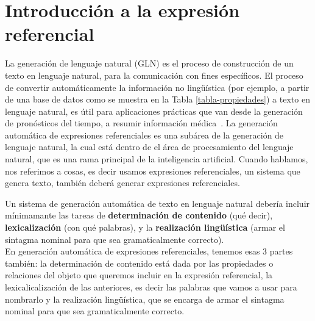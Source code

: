 \chapter{Introducci\'on a la expresi\'on referencial}
\label{sec:intro}



La generaci\'on de lenguaje natural (GLN) es el proceso de construcci\'on de un texto en lenguaje natural, para la comunicaci\'on con fines espec\'ificos. El proceso de convertir autom\'aticamente la informaci\'on no ling\"u\'{i}stica (por ejemplo, a partir de una base de datos como se muestra en la Tabla \ref{tabla-propiedades}) a texto en lenguaje natural, es \'util para aplicaciones pr\'acticas que van desde la generaci\'on de pron\'osticos del tiempo, a resumir informaci\'on m\'edica~\cite{dale2000}. La generaci\'on autom\'atica de expresiones referenciales es una sub\'area de la generaci\'on de lenguaje natural, la cual est\'a dentro de el \'area de procesamiento del lenguaje natural, que es una rama principal de la inteligencia artificial. Cuando hablamos, nos referimos a cosas, es decir usamos expresiones referenciales, un sistema que genera texto, tambi\'en deber\'a generar expresiones referenciales.


Un sistema de generaci\'on autom\'atica de texto en lenguaje natural deber\'ia incluir m\'inimamante 
las tareas de {\bf determinaci\'on de contenido} (qu\'e decir), {\bf lexicalizaci\'on} (con qu\'e palabras), y la {\bf realizaci\'on ling\"{u}\'istica} (armar el  sintagma nominal para que sea gramaticalmente correcto). \\
En generaci\'on autom\'atica de expresiones referenciales, tenemos esas 3 partes tambi\'en: la determinaci\'on de contenido est\'a dada por las propiedades o relaciones del objeto que queremos incluir en la expresi\'on referencial, la lexicalicalizaci\'on de las anteriores, es decir las palabras que vamos a usar para nombrarlo y la realizaci\'on ling\"u\'istica, que se encarga de armar el sintagma nominal para que sea gramaticalmente correcto.\\

